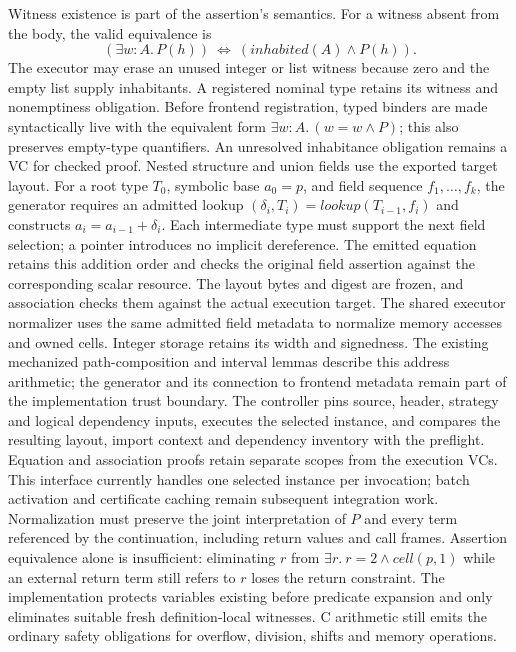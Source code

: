 Witness existence is part of the assertion's semantics. For a witness absent
from the body, the valid equivalence is
\[
  (\exists w:A.\,P(h))\ \Longleftrightarrow\
  (\mathit{inhabited}(A)\land P(h)).
\]
The executor may erase an unused integer or list witness because zero and the
empty list supply inhabitants. A registered nominal type retains its witness
and nonemptiness obligation. Before frontend registration, typed binders are
made syntactically live with the equivalent form
$\exists w:A.\,(w=w\land P)$; this also preserves empty-type quantifiers.
An unresolved inhabitance obligation remains a VC for checked proof.
Nested structure and union fields use the exported target layout. For a root
type $T_0$, symbolic base $a_0=p$, and field sequence $f_1,\ldots,f_k$, the
generator requires an admitted lookup
$(\delta_i,T_i)=\mathit{lookup}(T_{i-1},f_i)$ and constructs
$a_i=a_{i-1}+\delta_i$. Each intermediate type must support the next field
selection; a pointer introduces no implicit dereference. The emitted equation
retains this addition order and checks the original field assertion against
the corresponding scalar resource. The layout bytes and digest are frozen,
and association checks them against the actual execution target. The shared
executor normalizer uses the same admitted field metadata to normalize memory
accesses and owned cells. Integer storage retains its width and signedness.
The existing mechanized path-composition and interval lemmas describe this
address arithmetic; the generator and its connection to frontend metadata
remain part of the implementation trust boundary.
The controller pins source, header, strategy and logical dependency inputs,
executes the selected instance, and compares the resulting layout, import
context and dependency inventory with the preflight. Equation and association
proofs retain separate scopes from the execution VCs. This interface currently
handles one selected instance per invocation; batch activation and certificate
caching remain subsequent integration work.
Normalization must preserve the joint interpretation of $P$ and every term
referenced by the continuation, including return values and call frames.
Assertion equivalence alone is insufficient: eliminating $r$ from
$\exists r.\ r=2 \land \mathit{cell}(p,1)$ while an external return term still
refers to $r$ loses the return constraint. The implementation protects variables
existing before predicate expansion and only eliminates suitable fresh
definition-local witnesses. C arithmetic still emits the ordinary safety
obligations for overflow, division, shifts and memory operations.

